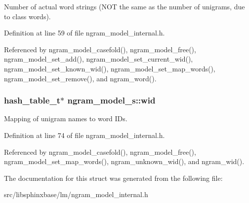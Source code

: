 Number of actual word strings (NOT the same as the number of unigrams, due to class words). 



Definition at line 59 of file ngram\_\-model\_\-internal.h.

Referenced by ngram\_\-model\_\-casefold(), ngram\_\-model\_\-free(), ngram\_\-model\_\-set\_\-add(), ngram\_\-model\_\-set\_\-current\_\-wid(), ngram\_\-model\_\-set\_\-known\_\-wid(), ngram\_\-model\_\-set\_\-map\_\-words(), ngram\_\-model\_\-set\_\-remove(), and ngram\_\-word().
\subsubsection[{wid}]{\setlength{\rightskip}{0pt plus 5cm}hash\_\-table\_\-t$\ast$ {\bf ngram\_\-model\_\-s::wid}}\label{structngram__model__s_75567419a8002ef6e916c81f5d9ee9ed}


Mapping of unigram names to word IDs. 



Definition at line 74 of file ngram\_\-model\_\-internal.h.

Referenced by ngram\_\-model\_\-casefold(), ngram\_\-model\_\-free(), ngram\_\-model\_\-set\_\-map\_\-words(), ngram\_\-unknown\_\-wid(), and ngram\_\-wid().

The documentation for this struct was generated from the following file:\begin{CompactItemize}
\item 
src/libsphinxbase/lm/ngram\_\-model\_\-internal.h\end{CompactItemize}
